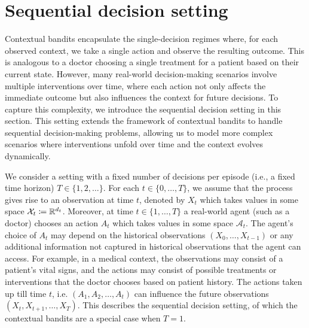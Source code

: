 \section{Sequential decision setting}
Contextual bandits encapsulate the single-decision regimes where, for each observed context, we take a single action and observe the resulting outcome. This is analogous to a doctor choosing a single treatment for a patient based on their current state. However, many real-world decision-making scenarios involve multiple interventions over time, where each action not only affects the immediate outcome but also influences the context for future decisions. To capture this complexity, we introduce the sequential decision setting in this section. This setting extends the framework of contextual bandits to handle sequential decision-making problems, allowing us to model more complex scenarios where interventions unfold over time and the context evolves dynamically.

We consider a setting with a fixed number of decisions per episode (i.e., a fixed time horizon) $T \in \{1, 2, \ldots\}$. For each $t\in \{0, \ldots, T\}$, we assume that the process gives rise to an observation at time $t$, denoted by $X_t$ which takes values in some space $\mathcal{X}_t \coloneqq \mathbb{R}^{d_t}$. 
Moreover, at time $t\in  \{1, \ldots, T\}$ a real-world agent (such as a doctor) chooses an action $A_t$ which takes values in some space $\mathcal{A}_t$. The agent's choice of $A_t$ may depend on the historical observations $(X_0, \ldots, X_{t-1})$ or any additional information not captured in historical observations that the agent can access. For example, in a medical context, the observations may consist of a patient's vital signs, and the actions may consist of possible treatments or interventions that the doctor chooses based on patient history.
The actions taken up till time $t$, i.e. $(A_1, A_2, \ldots, A_t)$ can influence the future observations $(X_t, X_{t+1}, \ldots, X_T)$. 
This describes the sequential decision setting, of which the contextual bandits are a special case when $T=1$. 

